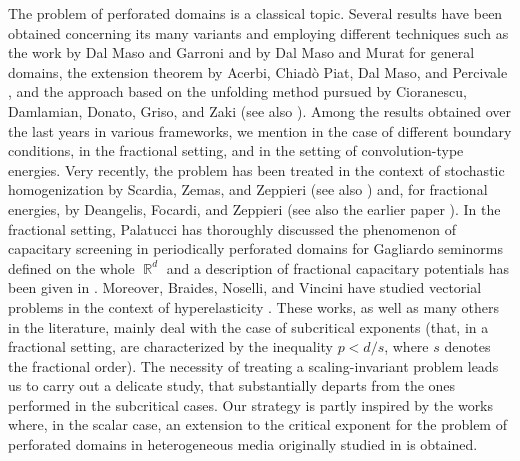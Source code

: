 \documentclass{article}
\theoremstyle{plain}
\theoremstyle{definition}
\DeclareMathOperator*{\R}{\mathbb{R}}
\numberwithin{equation}{section}
\begin{document}
The problem of perforated domains is a classical topic. Several results have been obtained concerning its many variants and employing different techniques such as the work by Dal Maso and Garroni \cite{DMG} and by Dal Maso and Murat \cite{DMM} for general domains, the extension theorem by Acerbi, Chiadò Piat, Dal Maso, and Percivale \cite{ACPDMP}, and the approach based on the unfolding method pursued by Cioranescu, Damlamian, Donato, Griso, and Zaki \cite{CDDGZ} (see also \cite{CDGb}). Among the results obtained over the last years in various frameworks, we mention \cite{CanCheZar, CherDonRos, KhraPlum} in the case of different boundary conditions, \cite{FocAdvMath} in the fractional setting, and \cite{BraChiDEl, BP2} in the setting of convolution-type energies. Very recently, the problem has been treated in the context of stochastic homogenization by Scardia, Zemas, and Zeppieri \cite{SZZ} (see also \cite{Bas}) and, for fractional energies, by Deangelis, Focardi, and Zeppieri \cite{DeaFocZep} (see also the earlier paper \cite{FocComPDEs}). In the fractional setting, Palatucci has thoroughly discussed the phenomenon of capacitary screening in periodically perforated domains for Gagliardo seminorms defined on the whole $\R^d$ \cite{Pal} and a description of fractional capacitary potentials has been given in \cite{FocPalZep}. Moreover, Braides, Noselli, and Vincini have studied vectorial problems in the context of \mbox{hyperelasticity} \cite{BraNosVin}. These works, as well as many others in the literature, mainly deal with the case of subcritical exponents (that, in a fractional setting, are characterized by the inequality $p<d/s$, where $s$ denotes the fractional order). The necessity of treating a scaling-invariant problem leads us to carry out a delicate study, that substantially departs from the ones performed in the subcritical cases. Our strategy is partly inspired by the works \cite{BraBru, BruNLA} where, in the scalar case, an extension to the critical exponent for the problem of perforated domains in heterogeneous media originally studied in \cite{AnsBraAAM} is obtained.

\smallskip
\end{document}
